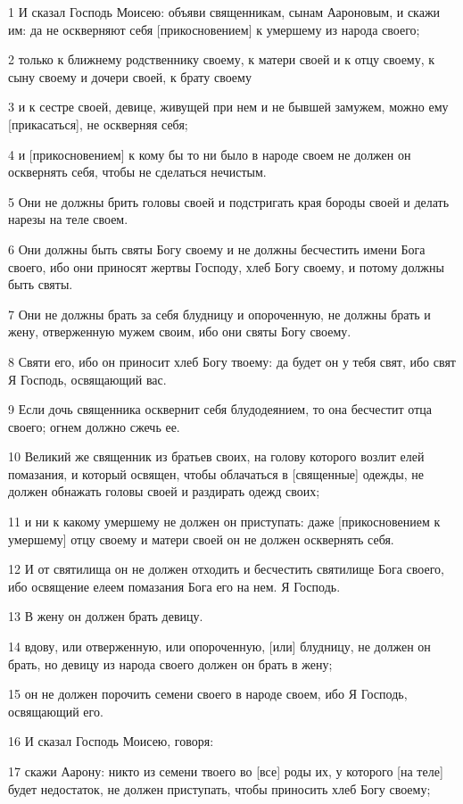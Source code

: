 \par 1 И сказал Господь Моисею: объяви священникам, сынам Аароновым, и скажи им: да не оскверняют себя [прикосновением] к умершему из народа своего;
\par 2 только к ближнему родственнику своему, к матери своей и к отцу своему, к сыну своему и дочери своей, к брату своему
\par 3 и к сестре своей, девице, живущей при нем и не бывшей замужем, можно ему [прикасаться], не оскверняя себя;
\par 4 и [прикосновением] к кому бы то ни было в народе своем не должен он осквернять себя, чтобы не сделаться нечистым.
\par 5 Они не должны брить головы своей и подстригать края бороды своей и делать нарезы на теле своем.
\par 6 Они должны быть святы Богу своему и не должны бесчестить имени Бога своего, ибо они приносят жертвы Господу, хлеб Богу своему, и потому должны быть святы.
\par 7 Они не должны брать за себя блудницу и опороченную, не должны брать и жену, отверженную мужем своим, ибо они святы Богу своему.
\par 8 Святи его, ибо он приносит хлеб Богу твоему: да будет он у тебя свят, ибо свят Я Господь, освящающий вас.
\par 9 Если дочь священника осквернит себя блудодеянием, то она бесчестит отца своего; огнем должно сжечь ее.
\par 10 Великий же священник из братьев своих, на голову которого возлит елей помазания, и который освящен, чтобы облачаться в [священные] одежды, не должен обнажать головы своей и раздирать одежд своих;
\par 11 и ни к какому умершему не должен он приступать: даже [прикосновением к умершему] отцу своему и матери своей он не должен осквернять себя.
\par 12 И от святилища он не должен отходить и бесчестить святилище Бога своего, ибо освящение елеем помазания Бога его на нем. Я Господь.
\par 13 В жену он должен брать девицу.
\par 14 вдову, или отверженную, или опороченную, [или] блудницу, не должен он брать, но девицу из народа своего должен он брать в жену;
\par 15 он не должен порочить семени своего в народе своем, ибо Я Господь, освящающий его.
\par 16 И сказал Господь Моисею, говоря:
\par 17 скажи Аарону: никто из семени твоего во [все] роды их, у которого [на теле] будет недостаток, не должен приступать, чтобы приносить хлеб Богу своему;
